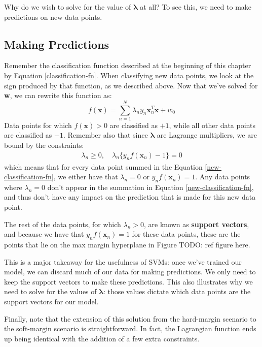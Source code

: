 Why do we wish to solve for the value of $\boldsymbol{\lambda}$ at all? To see this, we need to make predictions on new data points.

\subsection{Making Predictions}
Remember the classification function described at the beginning of this chapter by Equation \ref{classification-fn}. When classifying new data points, we look at the sign produced by that function, as we described above. Now that we've solved for \textbf{w}, we can rewrite this function as:
\begin{equation} \label{new-classification-fn}
	f(\textbf{x}) = \sum_{n=1}^{N} \lambda_{n} y_{n} \textbf{x}_{n}^{T} \textbf{x} + w_{0}
\end{equation}
Data points for which $f(\textbf{x}) > 0$ are classified as $+1$, while all other data points are classified as $-1$. Remember also that since $\boldsymbol{\lambda}$ are Lagrange multipliers, we are bound by the constraints:
\begin{align*}
	\lambda_{n} \geq 0, \quad \lambda_{n} \{y_{n} f(\textbf{x}_{n}) - 1\} = 0
\end{align*}
which means that for every data point summed in the Equation \ref{new-classification-fn}, we either have that $\lambda_{n} = 0$ or $y_{n} f(\textbf{x}_{n}) = 1$. Any data points where $\lambda_{n} = 0$ don't appear in the summation in Equation \ref{new-classification-fn}, and thus don't have any impact on the prediction that is made for this new data point. \newline

The rest of the data points, for which $\lambda_{n} > 0$, are known as \textbf{support vectors}, and because we have that $y_{n} f(\textbf{x}_{n}) = 1$ for these data points, these are the points that lie on the max margin hyperplane in Figure TODO: ref figure here.

This is a major takeaway for the usefulness of SVMs: once we've trained our model, we can discard much of our data for making predictions. We only need to keep the support vectors to make these predictions. This also illustrates why we need to solve for the values of $\boldsymbol{\lambda}$: those values dictate which data points are the support vectors for our model.

Finally, note that the extension of this solution from the hard-margin scenario to the soft-margin scenario is straightforward. In fact, the Lagrangian function ends up being identical with the addition of a few extra constraints.

